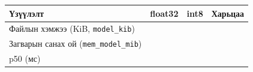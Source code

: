 \begingroup\scriptsize\begin{longtable}[]{@{}llll@{}}
\toprule
\begin{minipage}[b]{0.22\columnwidth}\raggedright
Үзүүлэлт\strut
\end{minipage} & \begin{minipage}[b]{0.22\columnwidth}\raggedright
float32\strut
\end{minipage} & \begin{minipage}[b]{0.22\columnwidth}\raggedright
int8\strut
\end{minipage} & \begin{minipage}[b]{0.22\columnwidth}\raggedright
Харьцаа\strut
\end{minipage}\tabularnewline
\midrule
\endhead
\begin{minipage}[t]{0.22\columnwidth}\raggedright
Файлын хэмжээ (KiB, \texttt{model\_kib})\strut
\end{minipage} & \begin{minipage}[t]{0.22\columnwidth}\raggedright
\strut
\end{minipage} & \begin{minipage}[t]{0.22\columnwidth}\raggedright
\strut
\end{minipage} & \begin{minipage}[t]{0.22\columnwidth}\raggedright
\strut
\end{minipage}\tabularnewline
\begin{minipage}[t]{0.22\columnwidth}\raggedright
Загварын санах ой (\texttt{mem\_\allowbreak{}model\_\allowbreak{}mib})\strut
\end{minipage} & \begin{minipage}[t]{0.22\columnwidth}\raggedright
\strut
\end{minipage} & \begin{minipage}[t]{0.22\columnwidth}\raggedright
\strut
\end{minipage} & \begin{minipage}[t]{0.22\columnwidth}\raggedright
\strut
\end{minipage}\tabularnewline
\begin{minipage}[t]{0.22\columnwidth}\raggedright
p50 (мс)\strut
\end{minipage} & \begin{minipage}[t]{0.22\columnwidth}\raggedright
\strut
\end{minipage} & \begin{minipage}[t]{0.22\columnwidth}\raggedright
\strut
\end{minipage} & \begin{minipage}[t]{0.22\columnwidth}\raggedright

\end{minipage}
\end{longtable}
